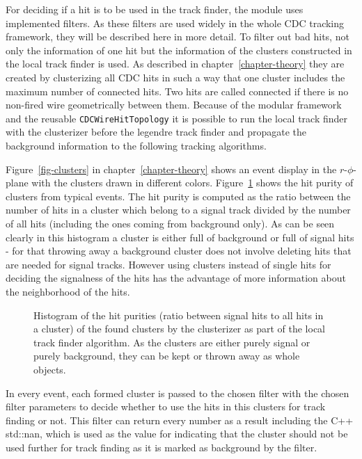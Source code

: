 For deciding if a hit is to be used in the track finder, the module uses implemented filters. As these filters are used widely in the whole CDC tracking framework, they will be described here in more detail. To filter out bad hits, not only the information of one hit but the information of the clusters constructed in the local track finder is used. As described in chapter~\ref{chapter-theory} they are created by clusterizing all CDC hits in such a way that one cluster includes the maximum number of connected hits. Two hits are called connected if there is no non-fired wire geometrically between them. Because of the modular framework and the reusable \texttt{CDCWireHitTopology} it is possible to run the local track finder with the clusterizer before the legendre track finder and propagate the background information to the following tracking algorithms. 

Figure~\ref{fig-clusters} in chapter~\ref{chapter-theory} shows an event display in the $r$-$\phi$-plane with the clusters drawn in different colors. Figure~\ref{fig-cluster-hit-purity} shows the hit purity of clusters from typical events. The hit purity is computed as the ratio between the number of hits in a cluster which belong to a signal track divided by the number of all hits (including the ones coming from background only). As can be seen clearly in this histogram a cluster is either full of background or full of signal hits - for that throwing away a background cluster does not involve deleting hits that are needed for signal tracks. However using clusters instead of single hits for deciding the signalness of the hits has the advantage of more information about the neighborhood of the hits.

\begin{figure}
  \caption{Histogram of the hit purities (ratio between signal hits to all hits in a cluster) of the found clusters by the clusterizer as part of the local track finder algorithm. As the clusters are either purely signal or purely background, they can be kept or thrown away as whole objects.}
  \label{fig-cluster-hit-purity}
\end{figure}

In every event, each formed cluster is passed to the chosen filter with the chosen filter parameters to decide whether to use the hits in this clusters for track finding or not. This filter can return every number as a result including the C++ std::nan, which is used as the value for indicating that the cluster should not be used further for track finding as it is marked as background by the filter.

